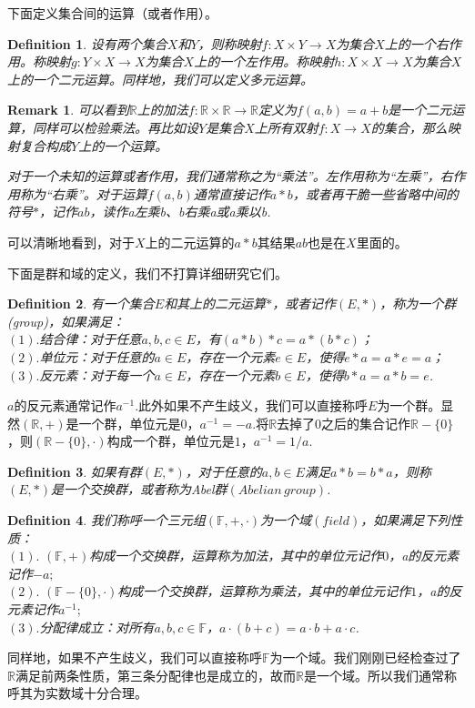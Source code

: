 \documentclass[11pt,a4paper,openany]{book}%
\theoremstyle{plain}%
\newtheorem*{rem}{Remark}%
\newtheorem{defi}{Definition}[chapter]%
\begin{document}
下面定义集合间的运算（或者作用）。
\begin{defi}设有两个集合$X$和$Y$，则称映射$f:X\times Y \rightarrow X$为集合$X$上的一个右作用。称映射$g:Y\times X \rightarrow X$为集合$X$上的一个左作用。称映射$h:X\times X \rightarrow X$为集合$X$上的一个二元运算。同样地，我们可以定义多元运算。
\end{defi}
\begin{rem}
可以看到$\mathbb{R}$上的加法$f:\mathbb{R}\times \mathbb{R} \rightarrow \mathbb{R}$定义为$f(a,b)=a+b$是一个二元运算，同样可以检验乘法。再比如设$Y$是集合$X$上所有双射$f:X\rightarrow X$的集合，那么映射复合构成$Y$上的一个运算。

对于一个未知的运算或者作用，我们通常称之为“乘法”。左作用称为“左乘”，右作用称为“右乘”。对于运算$f(a,b)$通常直接记作$a*b$，或者再干脆一些省略中间的符号$*$，记作$ab$，读作a左乘b、b右乘a或a乘以b.
\end{rem}
可以清晰地看到，对于$X$上的二元运算的$a*b$其结果$ab$也是在$X$里面的。

下面是群和域的定义，我们不打算详细研究它们。
\begin{defi}有一个集合$E$和其上的二元运算$*$，或者记作$(E,*)$，称为一个群\rm{(group)}，如果满足：\\
$(1).$结合律：对于任意$a,b,c\in E$，有$(a*b)*c=a*(b*c)$；\\
$(2).$单位元：对于任意的$a\in E$，存在一个元素$e\in E$，使得$e*a=a*e=a$；\\
$(3).$反元素：对于每一个$a\in E$，存在一个元素$b\in E$，使得$b*a=a*b=e$.
\end{defi}
$a$的反元素通常记作$a^{-1}$.此外如果不产生歧义，我们可以直接称呼$E$为一个群。显然$(\mathbb{R},+)$是一个群，单位元是0，$a^{-1}=-a$.将$\mathbb{R}$去掉了$0$之后的集合记作$\mathbb{R}-\{0\}$，则$(\mathbb{R}-\{0\},\cdot)$构成一个群，单位元是$1$，$a^{-1}=1/a$.
\begin{defi}
如果有群$(E,*)$，对于任意的$a,b\in E$满足$a*b=b*a$，则称$(E,*)$是一个交换群，或者称为{\rm Abel}群$(Abelian\,group)$.
\end{defi}
\begin{defi}
我们称呼一个三元组$(\mathbb{F},+,\cdot)$为一个域$(field)$，如果满足下列性质：\\
$(1).$\,\,$(\mathbb{F},+)$构成一个交换群，运算称为加法，其中的单位元记作$0$，a的反元素记作$-a;$\\
$(2).$\,\,$(\mathbb{F}-\{0\},\cdot)$构成一个交换群，运算称为乘法，其中的单位元记作$1$，a的反元素记作$a^{-1};$\\
$(3).$分配律成立：对所有$a,b,c \in \mathbb{F}$，$a\cdot(b+c)=a\cdot b+a\cdot c$.
\end{defi}
同样地，如果不产生歧义，我们可以直接称呼$\mathbb{F}$为一个域。我们刚刚已经检查过了$\mathbb{R}$满足前两条性质，第三条分配律也是成立的，故而$\mathbb{R}$是一个域。所以我们通常称呼其为实数域十分合理。
\end{document}
